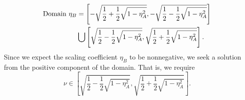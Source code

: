 \documentclass[reqno]{amsart}
\numberwithin{lemma}{section}
\numberwithin{proposition}{section}
\begin{document}
\begin{align*}
	 \textnormal{Domain} \ \eta_{B} &= \left [ -\sqrt{\frac{1}{2} + \frac{1}{2} \sqrt{1 - \eta_{A}^{2}}}, -\sqrt{\frac{1}{2} - \frac{1}{2} \sqrt{1 - \eta_{A}^{2}}} \right ] \\ 
	 \qquad & \bigcup \left [ \sqrt{\frac{1}{2} - \frac{1}{2} \sqrt{1 - \eta_{A}^{2}}}, \sqrt{\frac{1}{2} + \frac{1}{2} \sqrt{1 - \eta_{A}^{2}}} \right ].
\end{align*}
Since we expect the scaling coefficient $\eta_{B}$ to be nonnegative, we seek a solution from the positive component of the domain. That is, we require
\begin{equation*}
	\nu \in \left [ \sqrt{\frac{1}{2} - \frac{1}{2} \sqrt{1 - \eta_{A}^{2}}}, \sqrt{\frac{1}{2} + \frac{1}{2} \sqrt{1 - \eta_{A}^{2}}} \right ].
\end{equation*}
\end{document}
